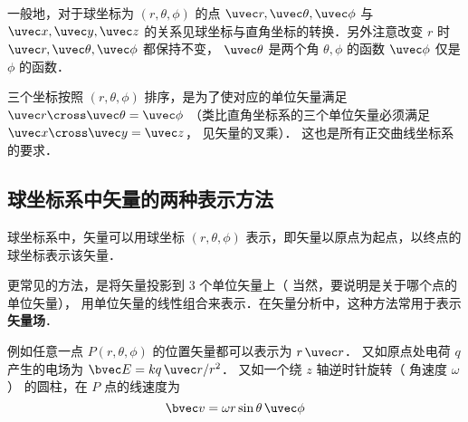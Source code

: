 一般地，对于球坐标为 $(r, \theta , \phi )$ 的点 $\uvec r, \uvec \theta, \uvec \phi$  与 $\uvec x, \uvec y, \uvec z$ 的关系见球坐标与直角坐标的转换．另外注意改变 $r$ 时 $\uvec r, \uvec \theta, \uvec \phi$ 都保持不变， $\uvec \theta$ 是两个角 $\theta, \phi$ 的函数 $\uvec \phi$ 仅是 $\phi$ 的函数．

三个坐标按照 $(r, \theta , \phi )$ 排序，是为了使对应的单位矢量满足 $\uvec r \cross \uvec \theta  = \uvec \phi $ （类比直角坐标系的三个单位矢量必须满足 $\uvec x \cross \uvec y = \uvec z$， 见矢量的叉乘）． 这也是所有正交曲线坐标系的要求．
 
\subsection{球坐标系中矢量的两种表示方法}
球坐标系中，矢量可以用球坐标 $(r, \theta, \phi)$ 表示，即矢量以原点为起点，以终点的球坐标表示该矢量．

更常见的方法，是将矢量投影到 3 个单位矢量上（ 当然，要说明是关于哪个点的单位矢量）， 用单位矢量的线性组合来表示．在矢量分析中，这种方法常用于表示\textbf{矢量场}．

例如任意一点 $P(r, \theta, \phi)$ 的位置矢量都可以表示为 $r\,\uvec r$． 又如原点处电荷 $q$ 产生的电场为 $\bvec E = k q \,\uvec r/r^2$． 又如一个绕 $z$ 轴逆时针旋转（ 角速度 $\omega $） 的圆柱，在 $P$ 点的线速度为
\begin{equation}
\bvec v = \omega r\sin \theta \,\uvec \phi 
\end{equation}

